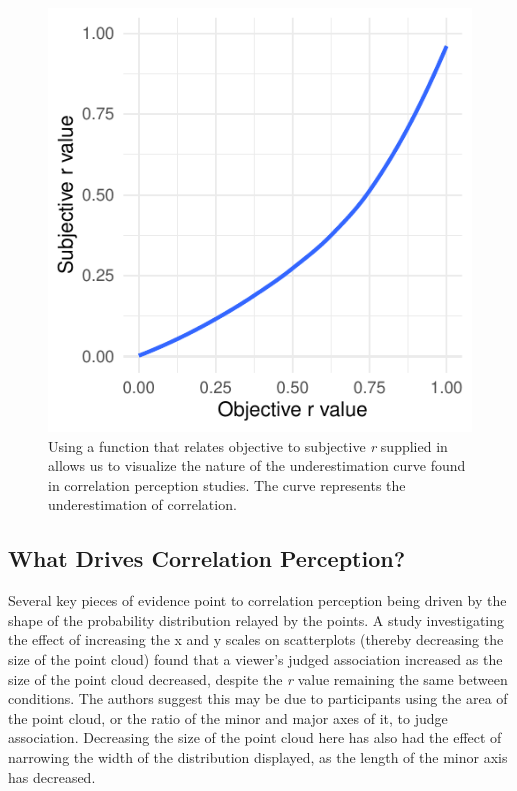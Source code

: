 \documentclass[preprint, 3p,
authoryear]{elsarticle} %
\begin{document}
\begin{figure}

\includegraphics{contrast_and_scatterplots_files/figure-latex/underestimation-curve-1} \hfill{}

\caption{\label{underestimation-curve}Using a function that relates objective to subjective \textit{r} supplied in \cite{rensink_2017} allows us to visualize the nature of the underestimation curve found in correlation perception studies. The curve represents the underestimation of correlation.}\label{fig:underestimation-curve}
\end{figure}

\hypertarget{what-drives-correlation-perception}{%
\subsection{What Drives Correlation
Perception?}\label{what-drives-correlation-perception}}

Several key pieces of evidence point to correlation perception being
driven by the shape of the probability distribution relayed by the
points. A study investigating the effect of increasing the x and y
scales on scatterplots (thereby decreasing the size of the point cloud)
\citep{cleveland_1982} found that a viewer's judged association
increased as the size of the point cloud decreased, despite the \emph{r}
value remaining the same between conditions. The authors suggest this
may be due to participants using the area of the point cloud, or the
ratio of the minor and major axes of it, to judge association.
Decreasing the size of the point cloud here has also had the effect of
narrowing the width of the distribution displayed, as the length of the
minor axis has decreased.
\end{document}
